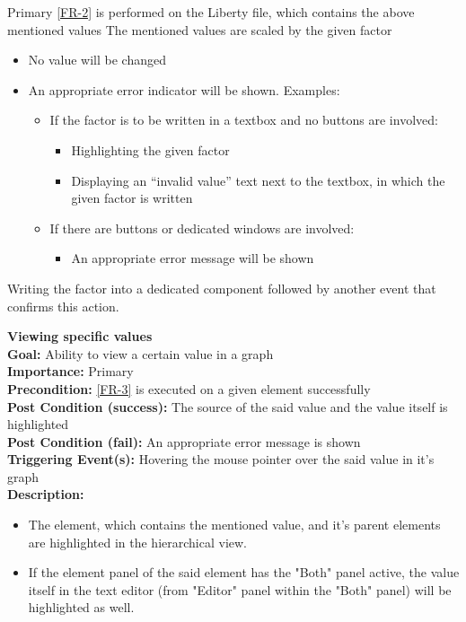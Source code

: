 \documentclass[10pt,a4paper]{report}
\newcommand{\precondition}[1]{
    \textbf{Precondition: } #1 \leavevmode \\
}
\newcommand{\FRDescription}[8]{
    \textbf{#1} \leavevmode \\
    \textbf{Goal: } #2 \leavevmode \\
    \textbf{Importance: } #3 \leavevmode \\
    \precondition{#4}
    \textbf{Post Condition (success): } #5 \leavevmode \\
    \textbf{Post Condition (fail): } #6 \leavevmode \\
    \textbf{Triggering Event(s): } #7 \leavevmode \\
    \textbf{Description: } \leavevmode \\ 
    #8}
\begin{document}
\begin{FR}
    {Primary}
    {\ref{FR-2} is performed on the Liberty file, which contains the above mentioned values}
    {The mentioned values are scaled by the given factor}
    {\begin{itemize}
        \item No value will be changed
        \item An appropriate error indicator will be shown. Examples:
        \begin{itemize}
            \item If the factor is to be written in a textbox and no buttons are involved:
            \begin{itemize}
                \item Highlighting the given factor
                \item Displaying an “invalid value” text next to the textbox, in which the given factor is written
            \end{itemize}
            \item If there are buttons or dedicated windows are involved:
            \begin{itemize}
                \item An appropriate error message will be shown
            \end{itemize}
        \end{itemize}
    \end{itemize}}
    {Writing the factor into a dedicated component followed by another event that confirms this action.}
    \item \FRDescription{Viewing specific values}
    {Ability to view a certain value in a graph}
    {Primary}
    {\ref{FR-3} is executed on a given element successfully}
    {The source of the said value and the value itself is highlighted}
    {An appropriate error message is shown}
    {Hovering the mouse pointer over the said value in it's graph}
    {\begin{itemize}
        \item The element, which contains the mentioned value, and it's parent elements are highlighted in the hierarchical view.
        \item If the element panel of the said element has the "Both" panel active, the value itself in the text editor (from "Editor" panel within the "Both" panel) will be highlighted as well.
    \end{itemize}}
    \item {} %

\end{FR}
\end{document}
